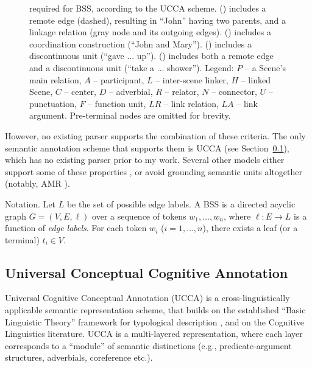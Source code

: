 \documentclass[11pt]{article}
\makeatletter
\newcommand{\secref}[1]{Section~\ref{#1}}
\renewcommand{\paragraph}{
  \@startsection{paragraph}{4}
  {\z@}{.3ex \@plus .3ex \@minus .2ex}{-1em}
  {\normalfont\normalsize\bfseries}
}
\makeatother
\begin{document}
\begin{figure}[ht!]
{    required for BSS, according to the UCCA scheme.
    () includes a remote edge (dashed),
    resulting in ``John'' having two parents, and a linkage relation (gray node and its outgoing edges).
    () includes a coordination construction (``John and Mary'').
    () includes a discontinuous unit (``gave ... up'').
    () includes both a remote edge and a discontinuous unit (``take a ... shower'').
    Legend: $P$ -- a Scene's main relation, $A$ -- participant,
    $L$ -- inter-scene linker, $H$ -- linked Scene, $C$ -- center, $D$ -- adverbial,
    $R$ -- relator, $N$ -- connector, $U$ -- punctuation, $F$ -- function unit,
    $LR$ -- link relation, $LA$ -- link argument.
    Pre-terminal nodes are omitted for brevity.
  }
\end{figure}

However, no existing parser supports the combination of these criteria.
The only semantic annotation scheme that supports them is UCCA (see \secref{sec:ucca}),
which has no existing parser prior to my work.
Several other models either support some of these properties \cite{oepen2015semeval},
or avoid grounding semantic units altogether
(notably, AMR \cite{banarescu2013abstract}).

\paragraph{Notation.}
Let $L$ be the set of possible edge labels.
A BSS is a directed acyclic graph $G=(V,E, \ell)$
over a sequence of tokens $w_1, \ldots, w_n$,
where $\ell:E\to L$ is a function of \textit{edge labels}.
For each token $w_i$ ($i=1, \ldots, n$), there exists a leaf (or a terminal) $t_i \in V$.

\subsection{Universal Conceptual Cognitive Annotation}\label{sec:ucca}
Universal Cognitive Conceptual Annotation (UCCA)
is a cross-linguistically applicable semantic representation scheme,
that builds on the established ``Basic Linguistic Theory'' framework for typological description
\cite{Dixon:10b,Dixon:10a,Dixon:12}, and on the Cognitive Linguistics literature.
UCCA is a multi-layered representation, where each layer corresponds to a ``module'' of
semantic distinctions (e.g., predicate-argument structures, adverbials, coreference etc.).
\end{document}
